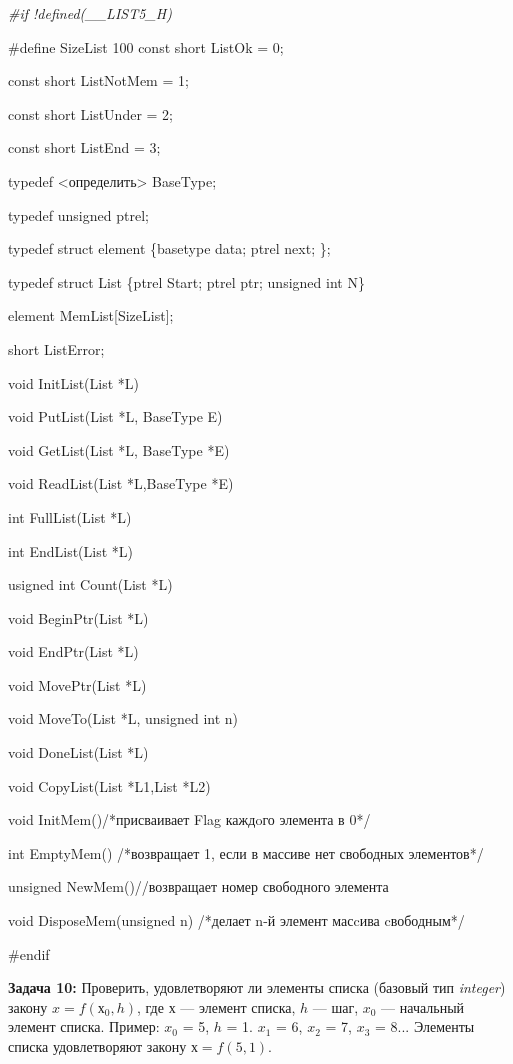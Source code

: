 \documentclass[12pt]{article}
\begin{document}
{	{\it \#if !defined(\_\_LIST5\_H)
	
	\#define   SizeList    100
	const short ListOk = 0;
	
	const short ListNotMem = 1;
	
	const short ListUnder = 2;
	
	const short ListEnd  = 3;
	
	typedef <определить>  BaseType;
	
	typedef   unsigned ptrel;
	
	typedef   struct element \{basetype data;
		ptrel next; \}; 
		
	typedef   struct List \{ptrel Start; 
		ptrel ptr;
		unsigned int N\}
		
	element MemList[SizeList];
	
	short   ListError;
	
	void InitList(List *L)
	
	void PutList(List *L, BaseType E)
	
	void GetList(List *L, BaseType *E)
	
	void ReadList(List *L,BaseType *E)
	
	int FullList(List *L)
	
	int EndList(List *L)
	
	usigned int Count(List *L)
	
	void BeginPtr(List *L)
	
	void EndPtr(List *L)
	
	void MovePtr(List *L)
	
	void MoveTo(List *L, unsigned int n)
	
	void DoneList(List *L)
	
	void CopyList(List *L1,List *L2)
	
	void InitMem()/*присваивает Flag каждoго элемента в 0*/
	
	int EmptyMem() /*возвращает 1, если в массиве нет свободных элементов*/
	
	unsigned  NewMem()//возвращает номер свободного элемента
	
	void DisposeMem(unsigned n) /*делает n-й элемент масcива cвободным*/
	
	\#endif}
	
	{\bf Задача 10:} Проверить,  удовлетворяют ли элементы списка (базовый тип {\it integer}) закону $x = f(х_0, h)$, где $х$ — элемент списка, $h$ — шаг, $x_0$ — начальный элемент списка.    
	Пример:  $x_0$ = 5, $h$ = 1. $x_1$ = 6, $x_2$ = 7, $x_3$ = 8... Элементы списка удовлетворяют закону $х = f(5, 1)$.
	
}
\end{document}
